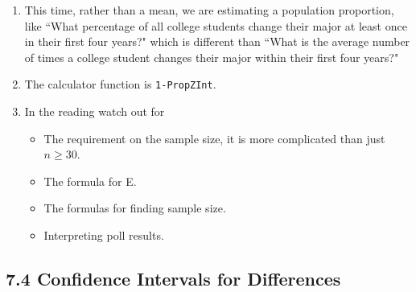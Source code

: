 \documentclass{ccg-topic}
\begin{document}
\begin{enumerate}

    \item This time, rather than a mean, we are estimating a population proportion, like ``What percentage of all college students change their major at least once in their first four years?"  which is different than ``What is the average number of times a college student changes their major within their first four years?"
    
    \item The calculator function is \texttt{1-PropZInt}.
    
    \item In the reading watch out for
    
        \begin{itemize}
        
            \item The requirement on the sample size, it is more complicated than just $n \geq 30$.
            
            \item The formula for E.
            
            \item The formulas for finding sample size.
            
            \item Interpreting poll results.
            
        \end{itemize}
        
\end{enumerate}

\subsection*{7.4 Confidence Intervals for Differences}
\end{document}
